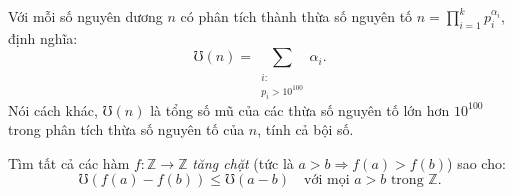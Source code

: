 \ifshowproblem
\begin{problem}\label{example:IMO-2015-SL-P8}
    Với mỗi số nguyên dương \( n \) có phân tích thành thừa số nguyên tố \( n = \prod_{i = 1}^{k} p_i^{\alpha_i} \), định nghĩa:
    \[
        \mho(n) = \sum_{\substack{i:\\ p_i > 10^{100}}} \alpha_i.
    \]
    Nói cách khác, \( \mho(n) \) là tổng số mũ của các thừa số nguyên tố lớn hơn \( 10^{100} \)
    trong phân tích thừa số nguyên tố của \( n \), tính cả bội số.
    
    Tìm tất cả các hàm \( f: \mathbb{Z} \to \mathbb{Z} \) \textit{tăng chặt} (tức là \( a > b \Rightarrow f(a) > f(b) \)) sao cho:
    \[
        \mho(f(a) - f(b)) \le \mho(a - b) \quad \text{với mọi } a > b \text{ trong } \mathbb{Z}.
    \]    
\end{problem}
\fi

\footnotemark
{}
\fi